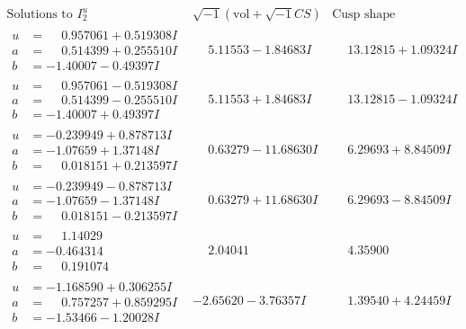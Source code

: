 \documentclass[1p]{elsarticle_modified}
\theoremstyle{definition}
\newcommand{\I}{\sqrt{-1}}
\begin{document}
$$\begin{array}{c|c|c}  
\text{Solutions to }I^u_{2}& \I (\text{vol} + \sqrt{-1}CS) & \text{Cusp shape}\\
 \hline 
\begin{aligned}
u &= \phantom{-}0.957061 + 0.519308 I \\
a &= \phantom{-}0.514399 + 0.255510 I \\
b &= -1.40007 - 0.49397 I\end{aligned}
 & \phantom{-}5.11553 - 1.84683 I & \phantom{-}13.12815 + 1.09324 I \\ \hline\begin{aligned}
u &= \phantom{-}0.957061 - 0.519308 I \\
a &= \phantom{-}0.514399 - 0.255510 I \\
b &= -1.40007 + 0.49397 I\end{aligned}
 & \phantom{-}5.11553 + 1.84683 I & \phantom{-}13.12815 - 1.09324 I \\ \hline\begin{aligned}
u &= -0.239949 + 0.878713 I \\
a &= -1.07659 + 1.37148 I \\
b &= \phantom{-}0.018151 + 0.213597 I\end{aligned}
 & \phantom{-}0.63279 - 11.68630 I & \phantom{-}6.29693 + 8.84509 I \\ \hline\begin{aligned}
u &= -0.239949 - 0.878713 I \\
a &= -1.07659 - 1.37148 I \\
b &= \phantom{-}0.018151 - 0.213597 I\end{aligned}
 & \phantom{-}0.63279 + 11.68630 I & \phantom{-}6.29693 - 8.84509 I \\ \hline\begin{aligned}
u &= \phantom{-}1.14029\phantom{ +0.000000I} \\
a &= -0.464314\phantom{ +0.000000I} \\
b &= \phantom{-}0.191074\phantom{ +0.000000I}\end{aligned}
 & \phantom{-}2.04041\phantom{ +0.000000I} & \phantom{-}4.35900\phantom{ +0.000000I} \\ \hline\begin{aligned}
u &= -1.168590 + 0.306255 I \\
a &= \phantom{-}0.757257 + 0.859295 I \\
b &= -1.53466 - 1.20028 I\end{aligned}
 & -2.65620 - 3.76357 I & \phantom{-}1.39540 + 4.24459 I \\ \hline\begin{aligned}

\end{aligned}
\end{array}$$
\end{document}
